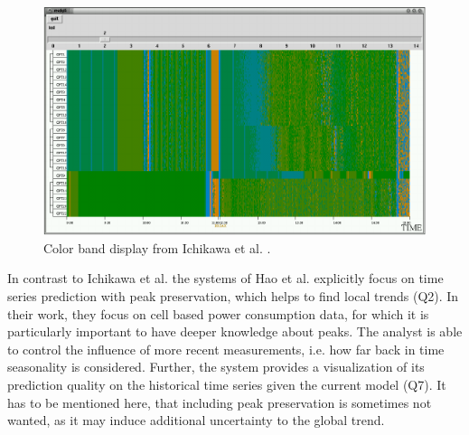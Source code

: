 \documentclass[electronic]{vgtc}             %
\begin{document}
\begin{figure}[!b]
	\centering
	\includegraphics[width=\columnwidth]{color-band}
	\caption{Color band display from Ichikawa et al. \cite{ichikawa:2002}.}
	\label{fig:color-band}
\end{figure}
In contrast to Ichikawa et al.\cite{ichikawa:2002} the systems of Hao et al. \cite{Hao:2011, Hao:2009} explicitly focus on time series prediction with peak preservation, which helps to find local trends (Q2).
In their work, they focus on cell based power consumption data, for which it is particularly important to have deeper knowledge about peaks.
The analyst is able to control the influence of more recent measurements, i.e. how far back in time seasonality is considered. 
Further, the system provides a visualization of its prediction quality on the historical time series given the current model (Q7). 
It has to be mentioned here, that including peak preservation is sometimes not wanted, as it may induce additional uncertainty to the global trend.
\end{document}
